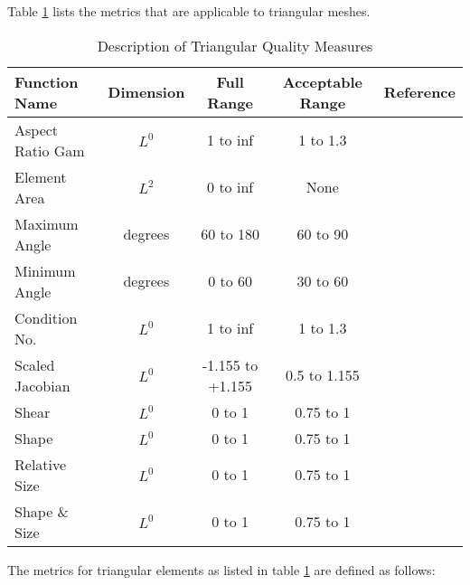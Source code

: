 \documentclass[10pt]{report}
\begin{document}
\begin{appendix}
Table \ref{tab:tri}
lists the metrics that are applicable to triangular meshes.  

\begin{table}[h]
\begin{center}
\begin{tabular}{|l|c|c|c|c|}
\hline
Function Name   & Dimension & Full Range &Acceptable Range &  Reference \\
\hline
Aspect Ratio Gam&  $L^0$ &     1 to inf   &     1 to 1.3   & \cite{parth} \\ 
Element Area    &  $L^2$ &     0 to inf   &      None      &        \\
Maximum Angle   & degrees&    60 to 180   &    60 to 90    &        \\
Minimum Angle   & degrees&     0 to 60    &    30 to 60    &        \\
Condition No.   &  $L^0$ &     1 to inf   &     1 to 1.3   & \cite{knupp2000} \\
Scaled Jacobian &  $L^0$ &-1.155 to +1.155&   0.5 to 1.155 & \cite{knupp2000} \\
Shear           &  $L^0$ &     0 to 1     &  0.75 to 1     & \cite{knupp2002} \\
Shape           &  $L^0$ &     0 to 1     &  0.75 to 1     & \cite{knupp2002} \\
Relative Size   &  $L^0$ &     0 to 1     &  0.75 to 1     & \cite{knupp2002} \\
Shape \& Size   &  $L^0$ &     0 to 1     &  0.75 to 1     & \cite{knupp2002} \\
\hline
\end{tabular}
\end{center}
\T\caption{Description of Triangular Quality Measures}
\label{tab:tri}
\end{table}


The metrics for triangular elements as listed in table 
\ref{tab:tri} are defined as follows:
\T\bigskip
\htmlrule


\end{appendix}
\end{document}
